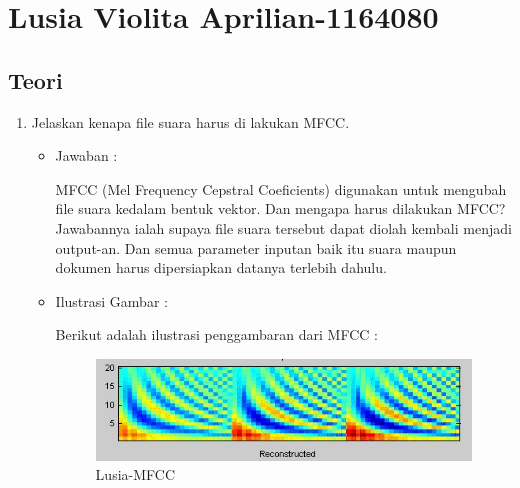 \par
\par
\par
\par
\section{Lusia Violita Aprilian-1164080}

\subsection{Teori}

\begin{enumerate}
\item Jelaskan kenapa file suara harus di lakukan MFCC.
	\begin{itemize}
	\item Jawaban :
		\par MFCC (Mel Frequency Cepstral Coeficients) digunakan untuk mengubah file suara kedalam bentuk vektor. Dan mengapa harus dilakukan MFCC? Jawabannya ialah supaya file suara tersebut dapat diolah kembali menjadi output-an. Dan semua parameter inputan baik itu suara maupun dokumen harus dipersiapkan datanya terlebih dahulu. 
	\item Ilustrasi Gambar :
		\par Berikut adalah ilustrasi penggambaran dari MFCC :
		\begin{figure}[!hbtp]
		\centering
		\includegraphics[scale=0.4]{figures/s1.jpg}
		\caption{Lusia-MFCC}
		\label{6A1}
		\end{figure}
	\end{itemize}
	

\end{enumerate}
